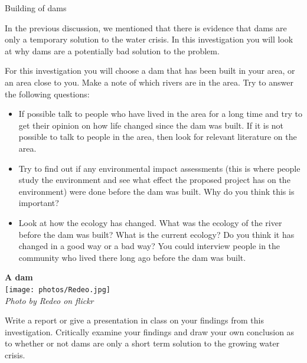 \par 
\label{m38138*id0123}
            \begin{Investigation}{Building of dams}
            \nopagebreak

\label{m38138*id0128031}In the previous discussion, we mentioned that there is evidence that dams are only a temporary solution to the water crisis. In this investigation you will look at why dams are a potentially bad solution to the problem. 
\par 
\label{m38138*id473692}For this investigation you will choose a dam that has been built in your area, or an area close to you. Make a note of which rivers are in the area. Try to answer the following questions: \\
\begin{minipage}{.7\textwidth}
\label{m38138*id774}\begin{itemize}[noitemsep]
            \label{m38138*id034582}\item If possible talk to people who have lived in the area for a long time and try to get their opinion on how life changed since the dam was built. If it is not possible to talk to people in the area, then look for relevant literature on the area.
\label{m38138*id08323}\item Try to find out if any environmental impact assessments (this is where people study the environment and see what effect the proposed project has on the environment) were done before the dam was built. Why do you think this is important? 
\label{m38138*id0832346}\item 
Look at how the ecology has changed. What was the ecology of the river before the dam was built? What is the current ecology? Do you think it has changed in a good way or a bad way? You could interview people in the community who lived there long ago before the dam was built.
\end{itemize}
        \par 
\end{minipage}
\begin{minipage}{.3\textwidth}
 \begin{center}
\textbf{A dam}\\
  \texttt{[image: photos/Redeo.jpg]} \\
\textsl{Photo by Redeo on flickr}
 \end{center}

\end{minipage}
\label{m38138*id08322432}
Write a report or give a presentation in class on your findings from this investigation. Critically examine your findings and draw your own conclusion as to whether or not dams are only a short term solution to the growing water crisis.

\par \end{Investigation}
